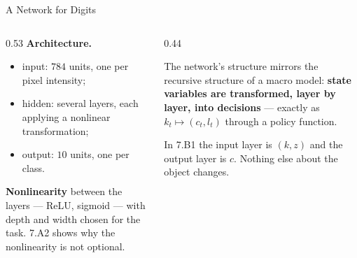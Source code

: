 \begin{frame}{A Network for Digits}
\begin{columns}[T]
\begin{column}{0.53\textwidth}
\small
\textbf{Architecture.}
\begin{itemize}\small\setlength{\itemsep}{1mm}
  \item input: $784$ units, one per pixel intensity;
  \item hidden: several layers, each applying a nonlinear transformation;
  \item output: $10$ units, one per class.
\end{itemize}
\medskip

\textbf{Nonlinearity} between the layers --- ReLU, sigmoid --- with depth and width chosen for the task. 7.A2 shows why the nonlinearity is not optional.
\end{column}
\begin{column}{0.44\textwidth}
\begin{conceptbox}[title=\textbf{The parallel that matters}]\small
The network's structure mirrors the recursive structure of a macro model: \textbf{state variables are transformed, layer by layer, into decisions} --- exactly as $k_t\mapsto(c_t,l_t)$ through a policy function.
\end{conceptbox}
\medskip
\begin{examplebox}\footnotesize
In 7.B1 the input layer is $(k,z)$ and the output layer is $c$. Nothing else about the object changes.
\end{examplebox}
\end{column}
\end{columns}
\end{frame}

